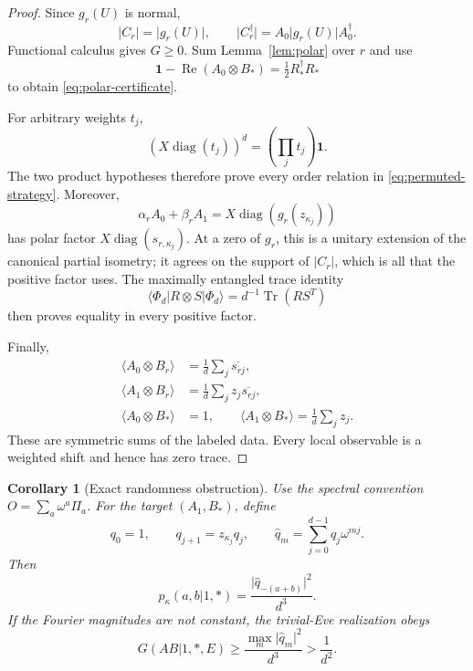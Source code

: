 \documentclass[11pt]{article}
\newtheorem{corollary}[theorem]{Corollary}
\theoremstyle{remark}
\newcommand{\Id}{\mathbf 1}
\newcommand{\Reop}{\operatorname{Re}}
\newcommand{\Tr}{\operatorname{Tr}}
\newcommand{\absop}[1]{\lvert #1\rvert}
\begin{document}
\begin{proof}
Since \(g_r(U)\) is normal,
\[
\absop{C_r}=\absop{g_r(U)},\qquad
\absop{C_r^\dagger}
=A_0\absop{g_r(U)}A_0^\dagger.
\]
Functional calculus gives \(G\geq0\).  Sum
Lemma~\ref{lem:polar} over \(r\) and use
\[
\Id-\Reop(A_0\otimes B_*)=\tfrac12R_*^\dagger R_*
\]
to obtain \eqref{eq:polar-certificate}.

For arbitrary weights \(t_j\),
\begin{equation}
\left(X\operatorname{diag}(t_j)\right)^d
=\left(\prod_jt_j\right)\Id.
\label{eq:weighted-cycle}
\end{equation}
The two product hypotheses therefore prove every order relation in
\eqref{eq:permuted-strategy}.  Moreover,
\[
\alpha_rA_0+\beta_rA_1
=
X\operatorname{diag}(g_r(z_{\kappa_j}))
\]
has polar factor
\(X\operatorname{diag}(s_{r,\kappa_j})\).
At a zero of \(g_r\), this is a unitary extension of the canonical partial
isometry; it agrees on the support of \(\absop{C_r}\), which is all that the
positive factor uses.
The maximally entangled trace identity
\[
\langle\Phi_d|R\otimes S|\Phi_d\rangle
=d^{-1}\Tr(RS^T)
\]
then proves equality in every positive factor.

Finally,
\[
\begin{aligned}
\langle A_0\otimes B_r\rangle
&=\frac1d\sum_j\overline{s_{rj}},\\
\langle A_1\otimes B_r\rangle
&=\frac1d\sum_jz_j\overline{s_{rj}},\\
\langle A_0\otimes B_*\rangle&=1,\qquad
\langle A_1\otimes B_*\rangle=\frac1d\sum_jz_j.
\end{aligned}
\]
These are symmetric sums of the labeled data.  Every local observable is a
weighted shift and hence has zero trace.
\end{proof}

\begin{corollary}[Exact randomness obstruction]\label{cor:target}
Use the spectral convention
\(O=\sum_a\omega^a\Pi_a\).  For the target
\((A_1,B_*)\), define
\[
q_0=1,\qquad q_{j+1}=z_{\kappa_j}q_j,\qquad
\widehat q_m=\sum_{j=0}^{d-1}q_j\omega^{mj}.
\]
Then
\begin{equation}
p_\kappa(a,b|1,*)
=
\frac{\absop{\widehat q_{-(a+b)}}^2}{d^3}.
\label{eq:target-table}
\end{equation}
If the Fourier magnitudes are not constant, the trivial-Eve realization
obeys
\[
G(AB|1,*,E)
\geq
\frac{\max_m\absop{\widehat q_m}^2}{d^3}
>\frac1{d^2}.
\]
\end{corollary}
\end{document}
